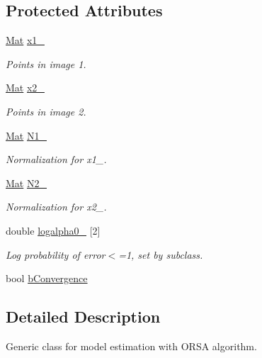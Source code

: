 \subsection*{Protected Attributes}
\begin{DoxyCompactItemize}
\item 
\hyperlink{classorsa_1_1OrsaModel_a522135c09871e55e3757780cc1ce57f5}{Mat} \hyperlink{classorsa_1_1OrsaModel_ab910d0735b9df04f62e76f2ba9a5f422}{x1\+\_\+}
\begin{DoxyCompactList}\small\item\em Points in image 1. \end{DoxyCompactList}\item 
\hyperlink{classorsa_1_1OrsaModel_a522135c09871e55e3757780cc1ce57f5}{Mat} \hyperlink{classorsa_1_1OrsaModel_afbc2fa3dd7b4403dbc8779491c2a0de2}{x2\+\_\+}
\begin{DoxyCompactList}\small\item\em Points in image 2. \end{DoxyCompactList}\item 
\hyperlink{classorsa_1_1OrsaModel_a522135c09871e55e3757780cc1ce57f5}{Mat} \hyperlink{classorsa_1_1OrsaModel_a2a743045785ff7a0bbb96f511d9796df}{N1\+\_\+}
\begin{DoxyCompactList}\small\item\em Normalization for x1\+\_\+. \end{DoxyCompactList}\item 
\hyperlink{classorsa_1_1OrsaModel_a522135c09871e55e3757780cc1ce57f5}{Mat} \hyperlink{classorsa_1_1OrsaModel_aa94cb453d88889164c75bb73edee6ebe}{N2\+\_\+}
\begin{DoxyCompactList}\small\item\em Normalization for x2\+\_\+. \end{DoxyCompactList}\item 
double \hyperlink{classorsa_1_1OrsaModel_a5ebaac101d5e4b50fa3be78af2a5ee5d}{logalpha0\+\_\+} \mbox{[}2\mbox{]}
\begin{DoxyCompactList}\small\item\em Log probability of error$<$=1, set by subclass. \end{DoxyCompactList}\item 
bool \hyperlink{classorsa_1_1OrsaModel_a360ddef39b62baaf9bd225765619c8fe}{b\+Convergence}
\end{DoxyCompactItemize}


\subsection{Detailed Description}
Generic class for model estimation with O\+R\+S\+A algorithm. 

